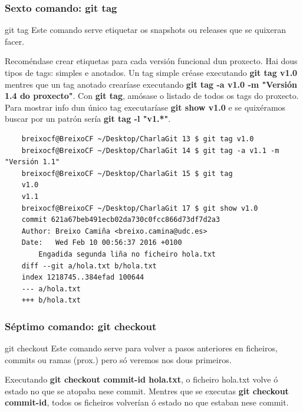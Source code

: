 \begin{frame}[fragile]
	\frametitle{Sexto comando: git tag}
	\begin{block}{git tag}
		Este comando serve etiquetar os snapshots ou releases que se quixeran facer.
	\end{block}
	\tiny
	Recoméndase crear etiquetas para cada versión funcional dun proxecto. Hai dous tipos de tags: simples e anotados. Un tag simple créase executando \textbf{git tag v1.0} mentres que un tag anotado crearíase executando \textbf{git tag -a v1.0 -m "Versión 1.4 do proxecto"}. Con \textbf{git tag}, amósase o listado de todos os tags do proxecto. Para mostrar info dun único tag executaríase \textbf{git show v1.0} e se quixéramos buscar por un patrón sería \textbf{git tag -l "v1.*"}.
	\tiny 
	\begin{verbatim}
	breixocf@BreixoCF ~/Desktop/CharlaGit 13 $ git tag v1.0
	breixocf@BreixoCF ~/Desktop/CharlaGit 14 $ git tag -a v1.1 -m "Versión 1.1"
	breixocf@BreixoCF ~/Desktop/CharlaGit 15 $ git tag 
	v1.0
	v1.1
	breixocf@BreixoCF ~/Desktop/CharlaGit 17 $ git show v1.0 
	commit 621a67beb491ecb02da730c0fcc866d73df7d2a3
	Author: Breixo Camiña <breixo.camina@udc.es>
	Date:   Wed Feb 10 00:56:37 2016 +0100
	    Engadida segunda liña no ficheiro hola.txt
	diff --git a/hola.txt b/hola.txt
	index 1218745..384efad 100644
	--- a/hola.txt
	+++ b/hola.txt
	\end{verbatim}
	\tiny
\end{frame}

\begin{frame}
	\frametitle{Séptimo comando: git checkout}
	\begin{block}{git checkout}
		Este comando serve para volver a pasos anteriores en ficheiros, commits ou ramas (prox.) pero só veremos nos dous primeiros.
	\end{block}
	\normalsize
	Executando \textbf{git checkout commit-id hola.txt}, o ficheiro hola.txt volve ó estado no que se atopaba nese commit. Mentres que se executas \textbf{git checkout commit-id}, todos os ficheiros volverían ó estado no que estaban nese commit.
	\tiny 
\end{frame}


